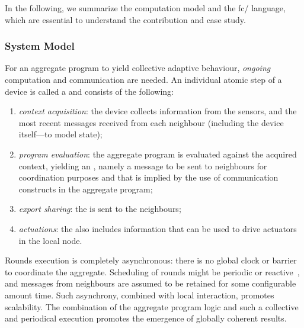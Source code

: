 
In the following, we summarize the computation model and the \ac{fc}/\scafi{} language, which are essential to understand the contribution and case study.

\subsubsection{System Model}

For an aggregate program to yield collective adaptive behaviour, \emph{ongoing} computation and communication are needed.
An individual atomic step of a device is called a \emph{\round{}} and consists of the following:
\begin{enumerate}
  \item \emph{context acquisition}: the device collects information from the sensors, 
  and the most recent messages received from each neighbour
  (including the device itself---to model state);
  \item \emph{program evaluation}: the aggregate program is evaluated against the acquired context,
  yielding an \emph{\export{}}, namely a message to be sent to neighbours for coordination purposes and that is implied by the use of communication constructs in the aggregate program;
  \item \emph{export sharing}: the \export{} is sent to the neighbours;
  \item \emph{actuations}: the \export{} also includes information that can be used to drive actuators in the local node.
\end{enumerate}
%
Rounds execution is completely asynchronous: there is no global clock or barrier to coordinate the aggregate. 
%
Scheduling of rounds might be periodic
 or reactive~\cite{lmcs-timefluid},
 and messages from neighbours are assumed to be retained for some configurable amount time.
%
Such asynchrony, combined with local interaction, promotes scalability. %
%
The combination of the aggregate program logic and such a collective %
and periodical execution promotes the emergence of globally coherent results.

